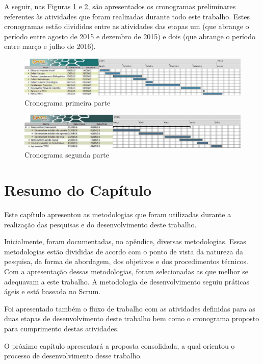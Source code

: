 A seguir, nas Figuras \ref{cronograma_parte_1} e \ref{cronograma_parte_2}, são apresentados os cronogramas preliminares referentes às atividades que foram realizadas durante todo este trabalho. Estes cronogramas estão divididos entre as atividades das etapas um (que abrange o período entre agosto de 2015 e dezembro de 2015) e dois (que abrange o período entre março e julho de 2016).

\begin{figure}[h]
	\centering
	\includegraphics[scale=0.3]{figuras/metodologia/gant1.eps}
	\caption{Cronograma primeira parte}
	\label{cronograma_parte_1}
\end{figure}

\begin{figure}[h]
	\centering
	\includegraphics[scale=0.3]{figuras/metodologia/gant2.eps}
	\caption{Cronograma segunda parte}
	\label{cronograma_parte_2}
\end{figure}

\section{Resumo do Capítulo}

Este capítulo apresentou as metodologias que foram utilizadas durante a realização das pesquisas e do desenvolvimento deste trabalho.

Inicialmente, foram documentadas, no apêndice, diversas metodologias. Essas metodologias estão divididas de acordo com o ponto de vista da natureza da pesquisa, da forma de abordagem, dos objetivos e dos procedimentos técnicos. Com a apresentação dessas metodologias, foram selecionadas as que melhor se adequavam a este trabalho. A metodologia de desenvolvimento seguiu práticas ágeis e está baseada no Scrum.

Foi apresentado também o fluxo de trabalho com as atividades definidas para as duas etapas de desenvolvimento deste trabalho bem como o cronograma proposto para cumprimento destas atividades.

O próximo capítulo apresentará a proposta consolidada, a qual orientou o processo de desenvolvimento desse trabalho.
